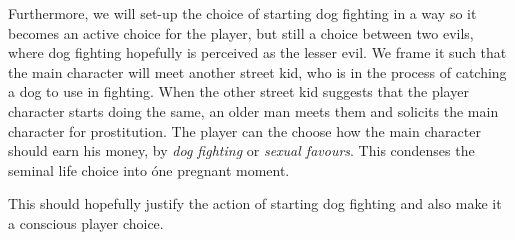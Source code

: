 Furthermore, we will set-up the choice of starting dog fighting in a way so it becomes an active choice for the player, but still a choice between two evils, where dog fighting hopefully is perceived as the lesser evil. We frame it such that the main character will meet another street kid, who is in the process of catching a dog to use in fighting. When the other street kid suggests that the player character starts doing the same, an older man meets them and solicits the main character for prostitution. The player can the choose how the main character should earn his money, by \textit{dog fighting} or \textit{sexual favours}. This condenses the seminal life choice into óne pregnant moment.\

This should hopefully justify the action of starting dog fighting and also make it a conscious player choice.\
